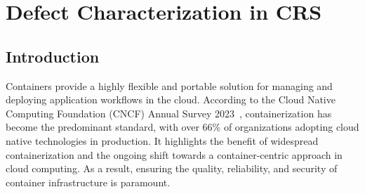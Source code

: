 \chapter{Defect Characterization in CRS}

\section{Introduction}

Containers provide a highly flexible and portable solution for managing and deploying application workflows in the cloud. According to the Cloud Native Computing Foundation (CNCF) Annual Survey 2023~\cite{cncfannual}, containerization has become the predominant standard, with over 66\% of organizations adopting cloud native technologies in production. It highlights the benefit of widespread containerization and the ongoing shift towards a container-centric approach in cloud computing. As a result, ensuring the quality, reliability, and security of container infrastructure is paramount.